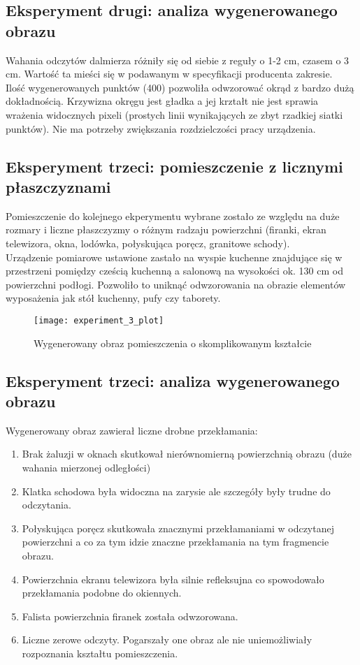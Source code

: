 \subsection {Eksperyment drugi: analiza wygenerowanego obrazu}
Wahania odczytów dalmierza różniły się od siebie z reguły o 1-2 cm, czasem o 3 cm. Wartość ta mieści się w podawanym w specyfikacji producenta zakresie.\\

Ilość wygenerowanych punktów (400) pozwoliła odwzorować okrąd z bardzo dużą dokładnością. Krzywizna okręgu jest gładka a jej krztałt nie jest sprawia wrażenia widocznych pixeli (prostych linii wynikających ze zbyt rzadkiej siatki punktów). Nie ma potrzeby zwiększania rozdzielczości pracy urządzenia.\\

\newpage
\subsection {Eksperyment trzeci: pomieszczenie z licznymi płaszczyznami}
Pomieszczenie do kolejnego ekperymentu wybrane zostało ze względu na duże rozmary i liczne płaszczyzmy o różnym radzaju powierzchni (firanki, ekran telewizora, okna, lodówka, połyskująca poręcz, granitowe schody).\\

Urządzenie pomiarowe ustawione zastało na wyspie kuchenne znajdujące się w przestrzeni pomiędzy cześcią kuchenną a salonową na wysokości ok. 130 cm od powierzchni podłogi. Pozwoliło to uniknąć odwzorowania na obrazie elementów wyposażenia jak stół kuchenny, pufy czy taborety.
\begin{figure}[h]
    \centering
    \texttt{[image: experiment\_3\_plot]}
    \caption{Wygenerowany obraz pomieszczenia o skomplikowanym kształcie}
    \label{fig:experiment_3_plot}
\end{figure}

\newpage
\subsection {Eksperyment trzeci: analiza wygenerowanego obrazu}
Wygenerowany obraz zawierał liczne drobne przekłamania:

\begin{enumerate}
    \item Brak żaluzji w oknach skutkował nierównomierną powierzchnią obrazu (duże wahania mierzonej odległości)
    \item Klatka schodowa była widoczna na zarysie ale szczegóły były trudne do odczytania.
    \item Połyskująca poręcz skutkowała znacznymi przekłamaniami w odczytanej powierzchni a co za tym idzie znaczne przekłamania na tym fragmencie obrazu.
    \item Powierzchnia ekranu telewizora była silnie refleksujna co spowodowało przekłamania podobne do okiennych.
    \item Falista powierzchnia firanek została odwzorowana.
    \item Liczne zerowe odczyty. Pogarszały one obraz ale nie uniemożliwiały rozpoznania kształtu pomieszczenia.
\end{enumerate}

